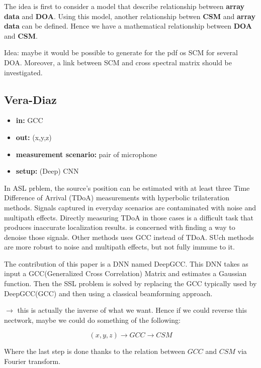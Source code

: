 \documentclass{article}
\begin{document}
The idea is first to consider a model that describe relationship between \textbf{array data} and \textbf{DOA}. Using this model, another relationship betwen \textbf{CSM} and \textbf{array data} can be defined. Hence we have a mathematical relationship between \textbf{DOA} and \textbf{CSM}.

Idea: maybe it would be possible to generate for the pdf os SCM for several DOA. Moreover, a link between SCM and cross spectral matrix should be investigated.

\subsection{Vera-Diaz}

\begin{itemize}
    \item \textbf{in:} GCC
    \item \textbf{out:} (x,y,z)
    \item \textbf{measurement scenario:} pair of microphone
    \item \textbf{setup:} (Deep) CNN
\end{itemize}

In ASL prblem, the source’s position can be estimated with at least three Time Difference of Arrival (TDoA) measurements with hyperbolic trilateration methods. Signals captured in everyday scenarios are contaminated with noise and multipath effects.
Directly measuring TDoA in those cases is a diﬃcult task that produces inaccurate localization results.\cite{vera2021acoustic} is concerned with finding a way to denoise those signals. Other methods uses GCC instead of TDoA. SUch methods are more robust to noise and multipath effects, but not fully immune to it. 

The contribution of this paper is a DNN named DeepGCC. This DNN takes as input a GCC(Generalized Cross Correlation) Matrix and estimates a Gaussian function. Then the SSL problem is solved by replacing the GCC typically used by DeepGCC(GCC) and then using a classical beamforming approach. 

$\rightarrow$ this is actually the inverse of what we want. Hence if we could reverse this nectwork, maybe we could do something of the following: 

\begin{equation}
    (x,y,z) \rightarrow GCC \rightarrow CSM
\end{equation}

Where the last step is done thanks to the relation between $GCC$ and $CSM$ via Fourier transform. 
\end{document}
